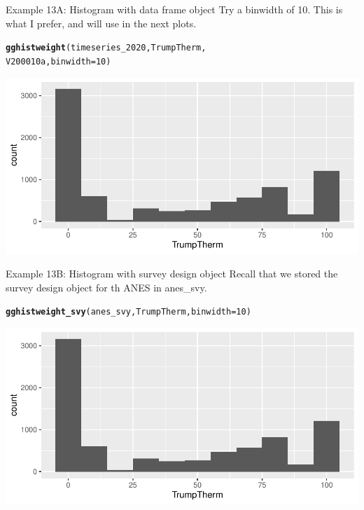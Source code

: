 \documentclass{beamer}\usepackage[]{graphicx}\usepackage[]{color}
\makeatletter
\newcommand{\hlnum}[1]{\textcolor[rgb]{0.686,0.059,0.569}{#1}}%
\newcommand{\hlstd}[1]{\textcolor[rgb]{0.345,0.345,0.345}{#1}}%
\newcommand{\hlkwc}[1]{\textcolor[rgb]{0.333,0.667,0.333}{#1}}%
\newcommand{\hlkwd}[1]{\textcolor[rgb]{0.737,0.353,0.396}{\textbf{#1}}}%
\newenvironment{kframe}{%
 \def\at@end@of@kframe{}%
 \ifinner\ifhmode%
  \def\at@end@of@kframe{\end{minipage}}%
  \begin{minipage}{\columnwidth}%
 \fi\fi%
 \def\FrameCommand##1{\hskip\@totalleftmargin \hskip-\fboxsep
 \colorbox{shadecolor}{##1}\hskip-\fboxsep
     \hskip-\linewidth \hskip-\@totalleftmargin \hskip\columnwidth}%
 \MakeFramed {\advance\hsize-\width
   \@totalleftmargin\z@ \linewidth\hsize
   \@setminipage}}%
 {\par\unskip\endMakeFramed%
 \at@end@of@kframe}
\newenvironment{knitrout}{}{} %
\makeatother
\begin{document}
\begin{frame}[fragile]{Example 13A: Histogram with data frame object}
Try a binwidth of 10. This is what I prefer, and will use in the next plots.
\begin{knitrout}
\color{fgcolor}\begin{kframe}
\begin{alltt}
\hlkwd{gghistweight}\hlstd{(timeseries_2020, TrumpTherm,}
    \hlstd{V200010a,} \hlkwc{binwidth} \hlstd{=} \hlnum{10}\hlstd{)}
\end{alltt}
\end{kframe}
\includegraphics[width=0.95\linewidth]{figure/unnamed-chunk-54-1} 
\end{knitrout}

\end{frame}

\begin{frame}[fragile]{Example 13B: Histogram with survey design object}
Recall that we stored the survey design object for th ANES in anes\_svy.
\begin{knitrout}
\color{fgcolor}\begin{kframe}
\begin{alltt}
\hlkwd{gghistweight_svy}\hlstd{(anes_svy, TrumpTherm,} \hlkwc{binwidth} \hlstd{=} \hlnum{10}\hlstd{)}
\end{alltt}
\end{kframe}
\includegraphics[width=0.95\linewidth]{figure/unnamed-chunk-55-1} 
\end{knitrout}

\end{frame}
\end{document}
